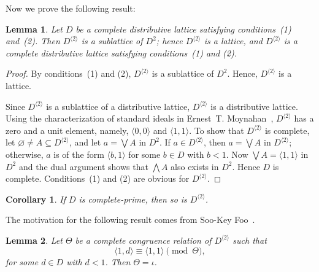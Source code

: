 \documentclass{amsart}
\theoremstyle{plain}
\newtheorem{corollary}{Corollary}
\newtheorem{lemma}{Lemma}
\theoremstyle{definition}
\theoremstyle{remark}
\numberwithin{equation}{section}
\begin{document}
Now we prove the following result:

\begin{lemma}\label{L:ds} 
   Let $D$ be a complete distributive lattice satisfying 
   conditions~\textup{(1)} and~\textup{(2)}.  Then 
   $D^{\langle 2 \rangle}$ is a sublattice of $D^{2}$; 
   hence $D^{\langle 2 \rangle}$ is a lattice, and 
   $D^{\langle 2 \rangle}$ is a complete distributive 
   lattice satisfying conditions~\textup{(1)} and \textup{(2)}. 
\end{lemma}

\begin{proof} 
   By conditions~(1) and (2), $D^{\langle 2 \rangle}$ is a sublattice 
   of $D^{2}$.  Hence, $D^{\langle 2 \rangle}$ is a lattice.

   Since $D^{\langle 2 \rangle}$ is a sublattice of a distributive
   lattice, $D^{\langle 2 \rangle}$ is a distributive lattice.  Using 
   the characterization of standard ideals in Ernest~T. Moynahan~\cite{eM57},
   $D^{\langle 2 \rangle}$ has a zero and a unit element,
   namely, $\langle 0, 0 \rangle$ and $\langle 1, 1 \rangle$. 
   To show that $D^{\langle 2 \rangle}$ is complete, let 
   $\varnothing \ne A \subseteq D^{\langle 2 \rangle}$, and let 
   $a = \bigvee A$ in $D^{2}$.  If 
   $a \in D^{\langle 2 \rangle}$, then 
   $a = \bigvee A$ in $D^{\langle 2 \rangle}$; otherwise, $a$ 
   is of the form $\langle b, 1 \rangle$ for some 
   $b \in D$ with $b < 1$.  Now $\bigvee A = \langle 1, 1\rangle$ 
   in $D^{2}$ and the dual argument shows that $\bigwedge A$ also 
   exists in $D^{2}$.  Hence $D$ is complete. Conditions~(1) and
   (2) are obvious for $D^{\langle 2 \rangle}$.
\end{proof}

\begin{corollary}\label{C:prime}
   If $D$ is complete-prime, then so is $D^{\langle 2 \rangle}$.
\end{corollary}

The motivation for the following result comes from Soo-Key Foo~\cite{sF90}.

\begin{lemma}\label{L:ccr} 
   Let $\Theta$ be a complete congruence relation of 
   $D^{\langle 2 \rangle}$ such that 
   \begin{equation}\label{E:rigid} 
      \langle 1, d \rangle \equiv \langle 1, 1 \rangle \pmod{\Theta}, 
   \end{equation} 
   for some $d \in D$ with $d < 1$. Then $\Theta = \iota$.
\end{lemma}
\end{document}
